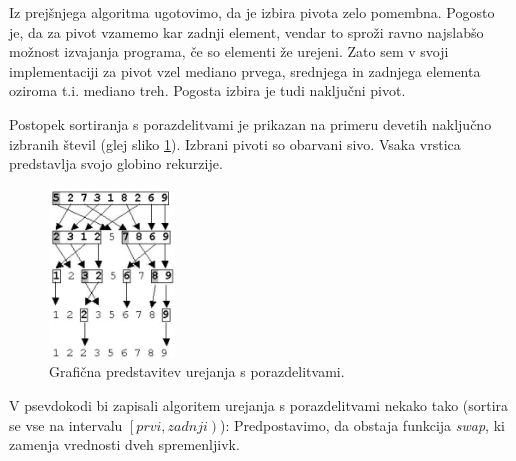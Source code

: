 \documentclass[a4paper,oneside]{article}
\begin{document}
Iz prejšnjega algoritma ugotovimo, da je izbira pivota zelo
pomembna. Pogosto je, da za pivot vzamemo kar zadnji element, vendar to sproži ravno
najslabšo možnost izvajanja programa, če so elementi že urejeni. Zato sem v svoji
implementaciji za pivot vzel mediano prvega, srednjega in zadnjega elementa oziroma t.i.
mediano treh. Pogosta izbira je tudi naključni pivot. 

Postopek sortiranja s porazdelitvami je prikazan na primeru devetih naključno
izbranih števil (glej sliko \ref{fig:quicksortimage}). Izbrani pivoti so obarvani sivo.
Vsaka vrstica predstavlja svojo globino rekurzije.

\begin{figure}[h]
    \begin{center}
        \includegraphics[height=45mm]{slike/quicksort.jpg}
    \end{center}
    \vspace{-0.7cm}
    \caption{Grafična predstavitev urejanja s porazdelitvami.}
    \label{fig:quicksortimage}
\end{figure}

V psevdokodi bi zapisali algoritem urejanja s porazdelitvami
nekako tako (sortira se vse na intervalu
$\left[prvi, zadnji\right)$):
Predpostavimo, da obstaja funkcija \emph{swap}, ki zamenja vrednosti dveh spremenljivk.
\end{document}
